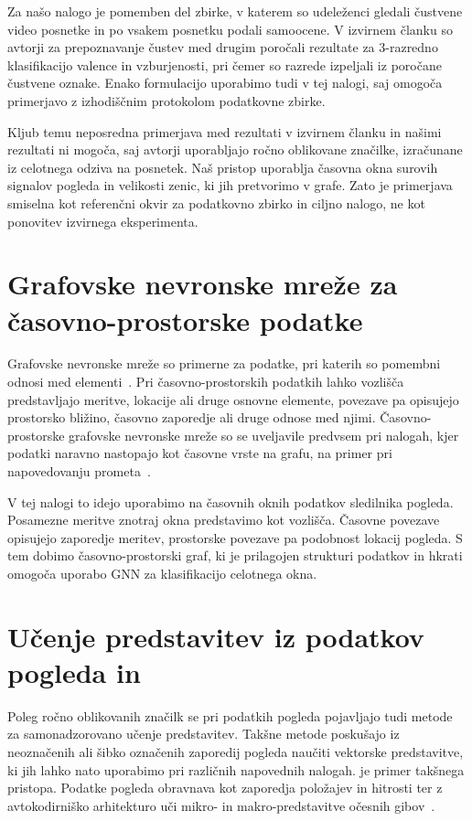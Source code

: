 Za našo nalogo je pomemben del zbirke, v katerem so udeleženci gledali čustvene video posnetke in po vsakem posnetku podali samoocene.
V izvirnem članku so avtorji za prepoznavanje čustev med drugim poročali rezultate za 3-razredno klasifikacijo valence in vzburjenosti, pri čemer so razrede izpeljali iz poročane čustvene oznake.
Enako formulacijo uporabimo tudi v tej nalogi, saj omogoča primerjavo z izhodiščnim protokolom podatkovne zbirke.

Kljub temu neposredna primerjava med rezultati v izvirnem članku in našimi rezultati ni mogoča, saj avtorji uporabljajo ročno oblikovane značilke, izračunane iz celotnega odziva na posnetek.
Naš pristop uporablja časovna okna surovih signalov pogleda in velikosti zenic, ki jih pretvorimo v grafe.
Zato je primerjava smiselna kot referenčni okvir za podatkovno zbirko in ciljno nalogo, ne kot ponovitev izvirnega eksperimenta.

\section{Grafovske nevronske mreže za časovno-prostorske podatke}
\label{subsec:sorodna-stgnn}

Grafovske nevronske mreže so primerne za podatke, pri katerih so pomembni odnosi med elementi~\cite{gilmer2017mpnn,kipf2017gcn,velickovic2018gat}.
Pri časovno-prostorskih podatkih lahko vozlišča predstavljajo meritve, lokacije ali druge osnovne elemente, povezave pa opisujejo prostorsko bližino, časovno zaporedje ali druge odnose med njimi.
Časovno-prostorske grafovske nevronske mreže so se uveljavile predvsem pri nalogah, kjer podatki naravno nastopajo kot časovne vrste na grafu, na primer pri napovedovanju prometa~\cite{yu2018stgcn}.

V tej nalogi to idejo uporabimo na časovnih oknih podatkov sledilnika pogleda.
Posamezne meritve znotraj okna predstavimo kot vozlišča.
Časovne povezave opisujejo zaporedje meritev, prostorske povezave pa podobnost lokacij pogleda.
S tem dobimo časovno-prostorski graf, ki je prilagojen strukturi podatkov in hkrati omogoča uporabo GNN za klasifikacijo celotnega okna.

\section{Učenje predstavitev iz podatkov pogleda in \GazeMAE{}}
\label{subsec:sorodna-gazemae}

Poleg ročno oblikovanih značilk se pri podatkih pogleda pojavljajo tudi metode za samonadzorovano učenje predstavitev.
Takšne metode poskušajo iz neoznačenih ali šibko označenih zaporedij pogleda naučiti vektorske predstavitve, ki jih lahko nato uporabimo pri različnih napovednih nalogah.
\GazeMAE{} je primer takšnega pristopa.
Podatke pogleda obravnava kot zaporedja položajev in hitrosti ter z avtokodirniško arhitekturo uči mikro- in makro-predstavitve očesnih gibov~\cite{bautista2021gazemae}.

